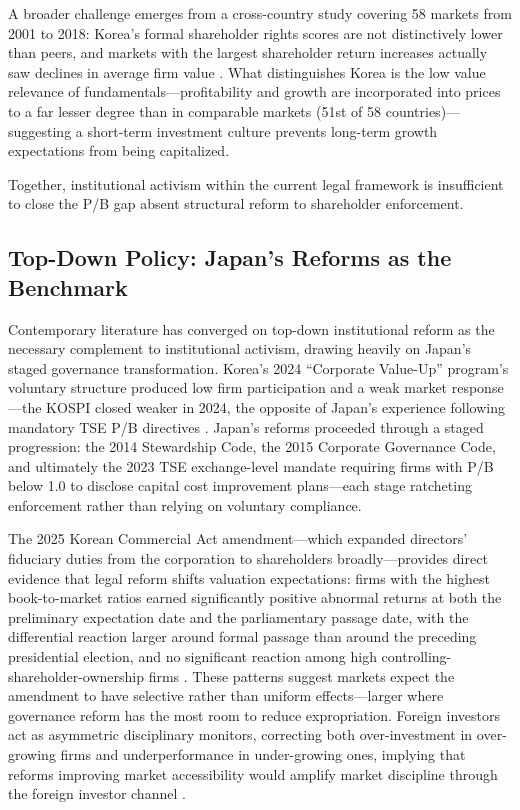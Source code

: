 A broader challenge emerges from a cross-country study covering 58 markets from 2001 to 2018: Korea's formal shareholder rights scores are not distinctively lower than peers, and markets with the largest shareholder return increases actually saw declines in average firm value \citep{kim_korea_discount_causes}. What distinguishes Korea is the low value relevance of fundamentals---profitability and growth are incorporated into prices to a far lesser degree than in comparable markets (51st of 58 countries)---suggesting a short-term investment culture prevents long-term growth expectations from being capitalized.

Together, institutional activism within the current legal framework is insufficient to close the P/B gap absent structural reform to shareholder enforcement.

\subsection{Top-Down Policy: Japan's Reforms as the Benchmark}
Contemporary literature has converged on top-down institutional reform as the necessary complement to institutional activism, drawing heavily on Japan's staged governance transformation. Korea's 2024 ``Corporate Value-Up'' program's voluntary structure produced low firm participation and a weak market response---the KOSPI closed weaker in 2024, the opposite of Japan's experience following mandatory TSE P/B directives \citep{lee_value_up_effectiveness}. Japan's reforms proceeded through a staged progression: the 2014 Stewardship Code, the 2015 Corporate Governance Code, and ultimately the 2023 TSE exchange-level mandate requiring firms with P/B below 1.0 to disclose capital cost improvement plans---each stage ratcheting enforcement rather than relying on voluntary compliance.

The 2025 Korean Commercial Act amendment---which expanded directors' fiduciary duties from the corporation to shareholders broadly---provides direct evidence that legal reform shifts valuation expectations: firms with the highest book-to-market ratios earned significantly positive abnormal returns at both the preliminary expectation date and the parliamentary passage date, with the differential reaction larger around formal passage than around the preceding presidential election, and no significant reaction among high controlling-shareholder-ownership firms \citep{kang_commercial_act_market_reactions}. These patterns suggest markets expect the amendment to have selective rather than uniform effects---larger where governance reform has the most room to reduce expropriation. Foreign investors act as asymmetric disciplinary monitors, correcting both over-investment in over-growing firms and underperformance in under-growing ones, implying that reforms improving market accessibility would amplify market discipline through the foreign investor channel \citep{joo_foreign_investors_value_up}.

